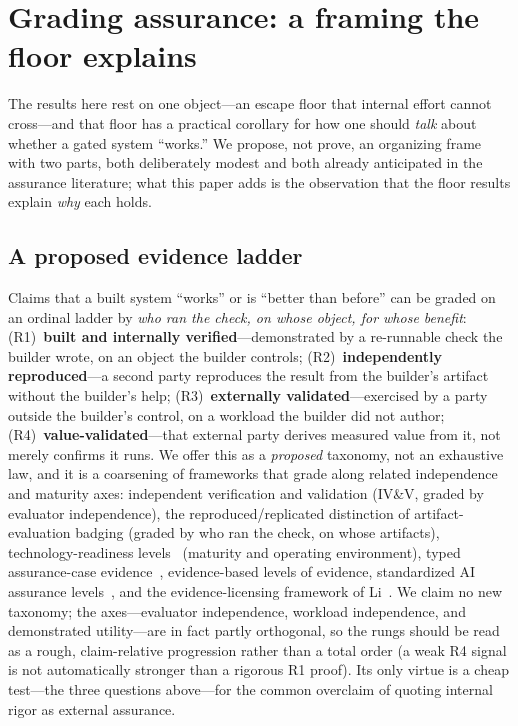 \documentclass[11pt]{article}
\theoremstyle{definition}
\theoremstyle{remark}
\begin{document}
\section{Grading assurance: a framing the floor explains}\label{sec:assurance}
The results here rest on one object---an escape floor that internal effort cannot cross---and that
floor has a practical corollary for how one should \emph{talk} about whether a gated system
``works.'' We propose, not prove, an organizing frame with two parts, both deliberately modest and both
already anticipated in the assurance literature; what this paper adds is the observation that the floor
results explain \emph{why} each holds.

\subsection{A proposed evidence ladder}
Claims that a built system ``works'' or is ``better than before'' can be graded on an ordinal ladder by
\emph{who ran the check, on whose object, for whose benefit}: (R1)~\textbf{built and internally
verified}---demonstrated by a re-runnable check the builder wrote, on an object the builder controls;
(R2)~\textbf{independently reproduced}---a second party reproduces the result from the builder's
artifact without the builder's help; (R3)~\textbf{externally validated}---exercised by a party outside
the builder's control, on a workload the builder did not author; (R4)~\textbf{value-validated}---that
external party derives measured value from it, not merely confirms it runs. We offer this as a
\emph{proposed} taxonomy, not an exhaustive law, and it is a coarsening of frameworks that grade along
related independence and maturity axes: independent verification and validation (IV\&V, graded by
evaluator independence), the reproduced/replicated distinction of artifact-evaluation badging (graded by
who ran the check, on whose artifacts), technology-readiness levels~\cite{mankins1995} (maturity and
operating environment), typed assurance-case evidence~\cite{gsn}, evidence-based levels of evidence,
standardized AI assurance
levels~\cite{aal2026}, and the evidence-licensing framework of Li~\cite{li2026}. We claim no new
taxonomy; the axes---evaluator independence, workload independence, and demonstrated utility---are in
fact partly orthogonal, so the rungs should be read as a rough, claim-relative progression rather than
a total order (a weak R4 signal is not automatically stronger than a rigorous R1 proof). Its only
virtue is a cheap test---the three questions above---for the common overclaim of quoting internal rigor
as external assurance.
\end{document}
